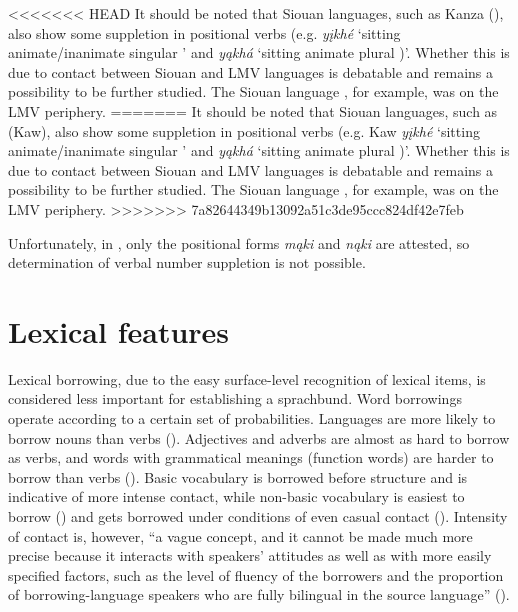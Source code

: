 \documentclass[output=paper]{LSP/langsci}
\begin{document}
<<<<<<< HEAD
	It should be noted that  Siouan languages, such as Kanza (), also show some suppletion in positional verbs (e.g.  \emph{yįkhé} `sitting animate/inanimate singular ' and \emph{yąkhá} `sitting animate plural )'. Whether this is due to contact between  Siouan and LMV languages is debatable and remains a possibility to be further studied. The  Siouan language , for example, was on the LMV periphery.
=======
	It should be noted that  Siouan languages, such as  (Kaw), also show some suppletion in positional verbs (e.g. Kaw \emph{yįkhé} `sitting animate/inanimate singular ' and \emph{yąkhá} `sitting animate plural )'. Whether this is due to contact between  Siouan and LMV languages is debatable and remains a possibility to be further studied. The  Siouan language , for example, was on the LMV periphery.
>>>>>>> 7a82644349b13092a51c3de95ccc824df42e7feb

Unfortunately, in , only the positional forms \emph{mąki} and \emph{nąki} are attested, so determination of verbal number suppletion is not possible.

\section{Lexical features}

	Lexical borrowing, due to the easy surface-level recognition of lexical items, is considered less important for establishing a sprachbund. Word borrowings operate according to a certain set of probabilities. Languages are more likely to borrow nouns than verbs (\citealt[231]{Tadmoretal2010}). Adjectives and adverbs are almost as hard to borrow as verbs, and words with grammatical meanings (function words) are harder to borrow than verbs (\citealt[231]{Tadmoretal2010}). Basic vocabulary is borrowed before structure and is indicative of more intense contact, while non-basic vocabulary is easiest to borrow (\citealt[69]{Thomason2001}) and gets borrowed under conditions of even casual contact (\citealt[231]{Tadmoretal2010}). Intensity of contact is, however, “a vague concept, and it cannot be made much more precise because it interacts with speakers’ attitudes as well as with more easily specified factors, such as the level of fluency of the borrowers and the proportion of borrowing-language speakers who are fully bilingual in the source language” (\citealt[231]{Tadmoretal2010}). 
\end{document}
